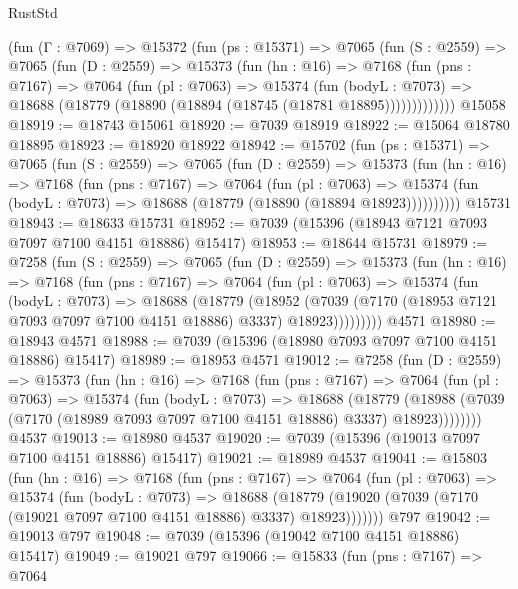 \begin{lexlean}{RustStd}
\begin{coremodule}
    (fun (Γ : @7069) =>
    @15372
      (fun (ps : @15371) =>
      @7065
        (fun (S : @2559) =>
        @7065
          (fun (D : @2559) =>
          @15373
            (fun (hn : @16) =>
            @7168
              (fun (pns : @7167) =>
              @7064
                (fun (pl : @7063) =>
                @15374
                  (fun (bodyL : @7073) =>
                  @18688 (@18779 (@18890 (@18894 (@18745 (@18781 @18895)))))))))))))
    @15058
@18919 := @18743 @15061
@18920 := @7039 @18919
@18922 := @15064 @18780 @18895
@18923 := @18920 @18922
@18942 := @15702
    (fun (ps : @15371) =>
    @7065
      (fun (S : @2559) =>
      @7065
        (fun (D : @2559) =>
        @15373
          (fun (hn : @16) =>
          @7168
            (fun (pns : @7167) =>
            @7064
              (fun (pl : @7063) =>
              @15374 (fun (bodyL : @7073) => @18688 (@18779 (@18890 (@18894 @18923))))))))))
    @15731
@18943 := @18633 @15731
@18952 := @7039 (@15396 (@18943 @7121 @7093 @7097 @7100 @4151 @18886) @15417)
@18953 := @18644 @15731
@18979 := @7258
    (fun (S : @2559) =>
    @7065
      (fun (D : @2559) =>
      @15373
        (fun (hn : @16) =>
        @7168
          (fun (pns : @7167) =>
          @7064
            (fun (pl : @7063) =>
            @15374
              (fun (bodyL : @7073) =>
              @18688
                (@18779
                  (@18952
                    (@7039
                      (@7170 (@18953 @7121 @7093 @7097 @7100 @4151 @18886) @3337)
                      @18923)))))))))
    @4571
@18980 := @18943 @4571
@18988 := @7039 (@15396 (@18980 @7093 @7097 @7100 @4151 @18886) @15417)
@18989 := @18953 @4571
@19012 := @7258
    (fun (D : @2559) =>
    @15373
      (fun (hn : @16) =>
      @7168
        (fun (pns : @7167) =>
        @7064
          (fun (pl : @7063) =>
          @15374
            (fun (bodyL : @7073) =>
            @18688
              (@18779
                (@18988 (@7039 (@7170 (@18989 @7093 @7097 @7100 @4151 @18886) @3337) @18923))))))))
    @4537
@19013 := @18980 @4537
@19020 := @7039 (@15396 (@19013 @7097 @7100 @4151 @18886) @15417)
@19021 := @18989 @4537
@19041 := @15803
    (fun (hn : @16) =>
    @7168
      (fun (pns : @7167) =>
      @7064
        (fun (pl : @7063) =>
        @15374
          (fun (bodyL : @7073) =>
          @18688
            (@18779 (@19020 (@7039 (@7170 (@19021 @7097 @7100 @4151 @18886) @3337) @18923)))))))
    @797
@19042 := @19013 @797
@19048 := @7039 (@15396 (@19042 @7100 @4151 @18886) @15417)
@19049 := @19021 @797
@19066 := @15833
    (fun (pns : @7167) =>
    @7064

\end{coremodule}
\end{lexlean}
